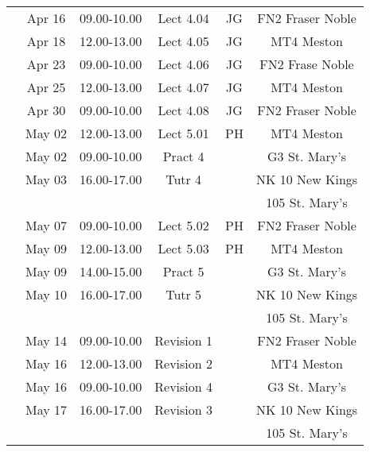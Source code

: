 \documentclass[11pt,oneside,a4paper]{article}
\begin{document}
\begin{center}
\begin{tabular}{||c||c|c|c|c|c||}
\hline\hline
\multirow{2}{*}{\color{red}{Week 41}} & Apr 16   & 09.00-10.00 & Lect  4.04  & JG  & FN2 Fraser Noble \\
                                      & Apr 18   & 12.00-13.00 & Lect  4.05  & JG  & MT4 Meston  \\
\hline
\multirow{2}{*}{\color{red}{Week 42}} & Apr 23   & 09.00-10.00 & Lect  4.06  & JG  & FN2 Frase Noble \\
                                      & Apr 25   & 12.00-13.00 & Lect  4.07  & JG  & MT4 Meston \\
\hline
\multirow{4}{*}{\color{red}{Week 43}} & Apr 30   & 09.00-10.00 & Lect  4.08  & JG  & FN2 Fraser Noble \\
                                      & May 02   & 12.00-13.00 & Lect  5.01  & PH  & MT4 Meston\\
                                      & May 02   & 09.00-10.00 & Pract 4     &     & G3 St. Mary's \\
                                      & May 03   & 16.00-17.00 & Tutr  4     &     & NK 10 New Kings \\
                                      &          &             &             &     & 105 St. Mary's \\
\hline
\multirow{5}{*}{\color{red}{Week 44}} & May 07   & 09.00-10.00 & Lect  5.02  & PH  & FN2 Fraser Noble \\
                                      & May 09   & 12.00-13.00 & Lect  5.03  & PH  & MT4 Meston \\
                                      & May 09   & 14.00-15.00 & Pract 5     &     & G3 St. Mary's \\
                                      & May 10   & 16.00-17.00 & Tutr  5     &     & NK 10 New Kings \\
                                      &          &             &             &     & 105 St. Mary's \\
\hline
\multirow{5}{*}{\color{red}{Week 45}} & May 14   & 09.00-10.00 & Revision 1  &     & FN2 Fraser Noble \\
                                      & May 16   & 12.00-13.00 & Revision 2  &     & MT4 Meston\\
                                      & May 16   & 09.00-10.00 & Revision 4  &     & G3 St. Mary's \\
                                      & May 17   & 16.00-17.00 & Revision 3  &     & NK 10 New Kings \\
                                      &          &             &             &     & 105 St. Mary's \\
\hline

\hline\hline

\end{tabular}
\end{center}
\end{document}
